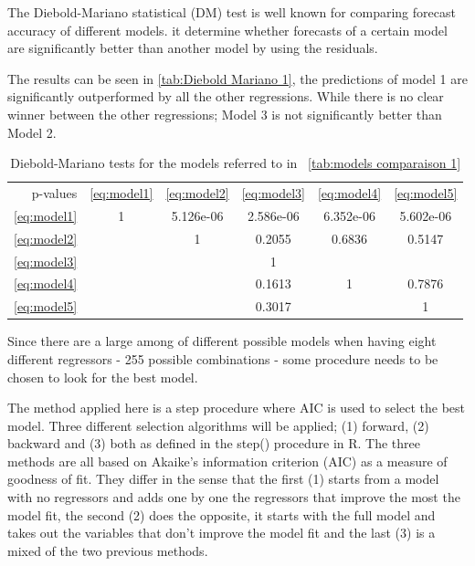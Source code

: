 \documentclass[12pt,a4paper,oneside]{book}
\begin{document}

The Diebold-Mariano statistical (DM) test \citep{diebold_comparing_1995} is well known for comparing forecast accuracy of different models. 
it determine whether forecasts of a certain model are significantly better than another model by using the residuals.


The results can be seen in \autoref{tab:Diebold Mariano 1}, the predictions of model 1 are significantly outperformed by all the other regressions. While there is no clear winner between the other regressions; Model 3 is not significantly better than Model 2.


\begin{table}[H]
    \caption{Diebold-Mariano tests for the models referred to in \ \autoref{tab:models comparaison 1} }
    \label{tab:Diebold Mariano 1}
     \centering \footnotesize
    \begin{tabular}{| r | c c c c c |}
    \cline{2-6}
 \multicolumn{0}{r|}{p-values}	& \ref{eq:model1} & \ref{eq:model2} & \ref{eq:model3} & \ref{eq:model4} & \ref{eq:model5} \\ \cline{1-6}
 \ref{eq:model1} & 1 & 5.126e-06 & 2.586e-06 & 6.352e-06 & 5.602e-06\\ 
 \ref{eq:model2} &   & 1  & 0.2055 & 0.6836 & 0.5147 \\
 \ref{eq:model3} &   &   & 1 & &   \\
 \ref{eq:model4} &   &   &  0.1613 & 1 & 0.7876 \\
 \ref{eq:model5} &   &   & 0.3017 &   & 1 \\ \cline{1-6}
\end{tabular}
\end{table}




Since there are a large among of different possible models when having eight different regressors - 255 possible combinations - some procedure needs to be chosen to look for the best model.

The method applied here is a step procedure where AIC is used to select the best model.
Three different selection algorithms will be applied; (1) forward, (2) backward and (3) both as defined in the step() procedure in R. 
The three methods are all based on Akaike's information criterion (AIC) as a measure of goodness of fit. They differ in the sense that the first (1) starts from a model with no regressors and adds one by one the regressors that improve the most the model fit, the second (2) does the opposite, it starts with the full model and takes out the variables that don't improve the model fit and the last (3) is a mixed of the two previous methods.
\end{document}
